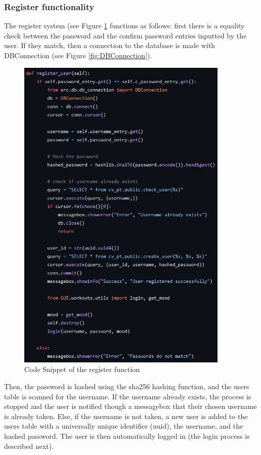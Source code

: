         \subsubsection{Register functionality}
            The register system (see Figure \ref{fig:register} functions as follows: first there is a equality check between the password and the confirm password entries inputted by the user. If they match, then a connection to the database is made with DBConnection (see Figure \ref{fig:DBConnection}). 

            \begin{figure}[htbp]
                    \centering
                    \includegraphics[width=0.9\textwidth]{figures/register_code.png}
                    \caption{Code Snippet of the register function}
                    \label{fig:register}
            \end{figure}

            Then, the password is hashed using the sha256 hashing function, and the users table is scanned for the username. If the username already exists, the process is stopped and the user is notified though a messagebox that their chosen username is already taken. Else, if the username is not taken, a new user is added to the users table with a universally unique identifier (uuid), the username, and the hashed password. The user is then automatically logged in (the login process is described next). 

